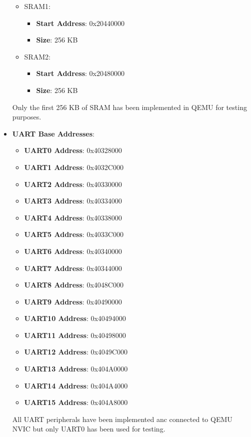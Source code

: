 \begin{itemize}
{\begin{itemize}
{                \begin{itemize}
                    \item \textbf{Start Address}: 0x20400000
                    \item \textbf{Size}: 256 KB
                \end{itemize}
            }
            \item { SRAM1:
                \begin{itemize}
                    \item \textbf{Start Address}: 0x20440000
                    \item \textbf{Size}: 256 KB
                \end{itemize}
            }
            \item { SRAM2:
                \begin{itemize}
                    \item \textbf{Start Address}: 0x20480000
                    \item \textbf{Size}: 256 KB
                \end{itemize}
            }
        \end{itemize}
        Only the first 256 KB of SRAM has been implemented in QEMU for testing purposes.
    }
    \item {\textbf{UART Base Addresses}:
        \begin{itemize}
            \item \textbf{UART0 Address}: 0x40328000
            \item \textbf{UART1 Address}: 0x4032C000
            \item \textbf{UART2 Address}: 0x40330000
            \item \textbf{UART3 Address}: 0x40334000
            \item \textbf{UART4 Address}: 0x40338000
            \item \textbf{UART5 Address}: 0x4033C000
            \item \textbf{UART6 Address}: 0x40340000
            \item \textbf{UART7 Address}: 0x40344000
            \item \textbf{UART8 Address}: 0x4048C000
            \item \textbf{UART9 Address}: 0x40490000
            \item \textbf{UART10 Address}: 0x40494000
            \item \textbf{UART11 Address}: 0x40498000
            \item \textbf{UART12 Address}: 0x4049C000
            \item \textbf{UART13 Address}: 0x404A0000
            \item \textbf{UART14 Address}: 0x404A4000
            \item \textbf{UART15 Address}: 0x404A8000
        \end{itemize}
        All UART peripherals have been implemented anc connected to QEMU NVIC but only UART0 has been used for testing.
    }


\end{itemize}

